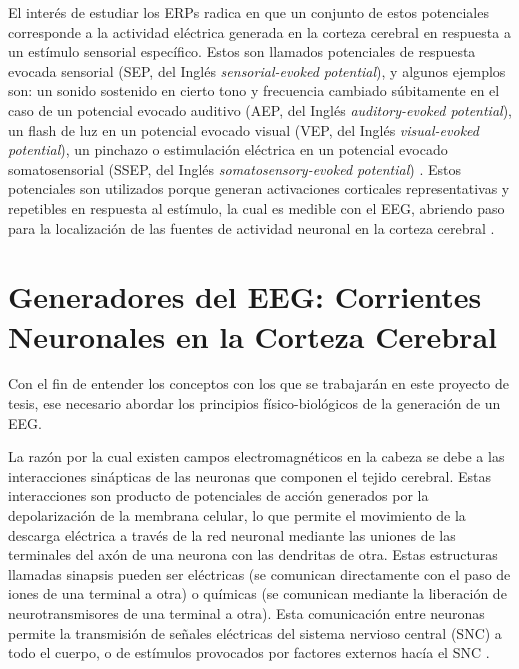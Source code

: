 El interés de estudiar los ERPs radica en que un conjunto de estos potenciales corresponde a la actividad eléctrica generada en la corteza cerebral en respuesta a un estímulo sensorial específico.
Estos son llamados potenciales de respuesta evocada sensorial (SEP, del Inglés \emph{sensorial-evoked potential}), y algunos ejemplos son: un sonido sostenido en cierto tono y frecuencia cambiado súbitamente en el caso de un potencial evocado auditivo (AEP, del Inglés \emph{auditory-evoked potential}), un flash de luz en un potencial evocado visual (VEP, del Inglés \emph{visual-evoked potential}), un pinchazo o estimulación eléctrica en un potencial evocado somatosensorial (SSEP, del Inglés \emph{somatosensory-evoked potential}) \cite{kreutzerEncyclopediaClinicalNeuropsychology2011}.
Estos potenciales son utilizados porque generan activaciones corticales representativas y repetibles en respuesta al estímulo, la cual es medible con el EEG, abriendo paso para la localización de las fuentes de actividad neuronal en la corteza cerebral \cite{luckIntroductionEventrelatedPotential2014}.

\section{Generadores del EEG: Corrientes Neuronales en la Corteza Cerebral}
\label{sec:intro:generators}

Con el fin de entender los conceptos con los que se trabajarán en este proyecto de tesis, ese necesario abordar los principios físico-biológicos de la generación de un EEG.

La razón por la cual existen campos electromagnéticos en la cabeza se debe a las interacciones sinápticas de las neuronas que componen el tejido cerebral.
Estas interacciones son producto de potenciales de acción generados por la depolarización de la membrana celular, lo que permite el movimiento de la descarga eléctrica a través de la red neuronal mediante las uniones de las terminales del axón de una neurona con las dendritas de otra.
Estas estructuras llamadas sinapsis pueden ser eléctricas (se comunican directamente con el paso de iones de una terminal a otra) o químicas (se comunican mediante la liberación de neurotransmisores de una terminal a otra).
Esta comunicación entre neuronas permite la transmisión de señales eléctricas del sistema nervioso central (SNC) a todo el cuerpo, o de estímulos provocados por factores externos hacía el SNC \cite{kandelPrinciplesNeuralScience2013}.

